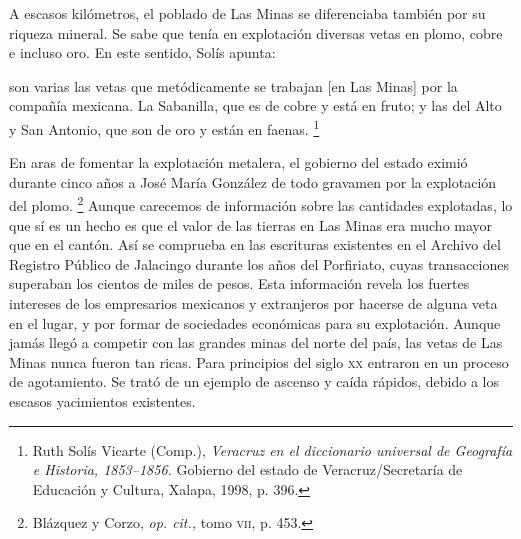 \documentclass[14pt,twoside,final]{extbook} %
\let\oldfootnote\footnote
\renewcommand\footnote[1]{%
\oldfootnote{\hspace{1mm}#1}}
\begin{document}
A escasos kilómetros, el poblado de Las Minas se diferenciaba también por su riqueza mineral. Se sabe que tenía en explotación diversas vetas en plomo, cobre e incluso oro. En este sentido, Solís apunta:
\begin{quoting}
son varias las vetas que metódicamente se trabajan [en Las Minas] por la compañía mexicana. La Sabanilla, que es de cobre y está en fruto; y las del Alto y San Antonio, que son de oro y están en faenas.\footnote{Ruth Solís Vicarte (Comp.), \emph{Veracruz en el diccionario universal de Geografía e Historia, 1853--1856.} Gobierno del estado de Veracruz/Secretaría de Educación y Cultura, Xalapa, 1998, p. 396.}
\end{quoting}
En aras de fomentar la explotación metalera, el gobierno del estado eximió durante cinco años a José María González de todo gravamen por la explotación del plomo.\footnote{Blázquez y Corzo, \emph{op. cit.,} tomo \textsc{vii}, p. 453.} Aunque carecemos de información sobre las cantidades explotadas, lo que sí es un hecho es que el valor de las tierras en Las Minas era mucho mayor que en el cantón. Así se comprueba en las escrituras existentes en el Archivo del Registro Público de Jalacingo durante los años del Porfiriato, cuyas transacciones superaban los cientos de miles de pesos. Esta información revela los fuertes intereses de los empresarios mexicanos y extranjeros por hacerse de alguna veta en el lugar, y por formar de sociedades económicas para su explotación. Aunque jamás llegó a competir con las grandes minas del norte del país, las vetas de Las Minas nunca fueron tan ricas. Para principios del siglo \textsc{xx} entraron en un proceso de agotamiento. Se trató de un ejemplo de ascenso y caída rápidos, debido a los escasos yacimientos existentes.
\end{document}
